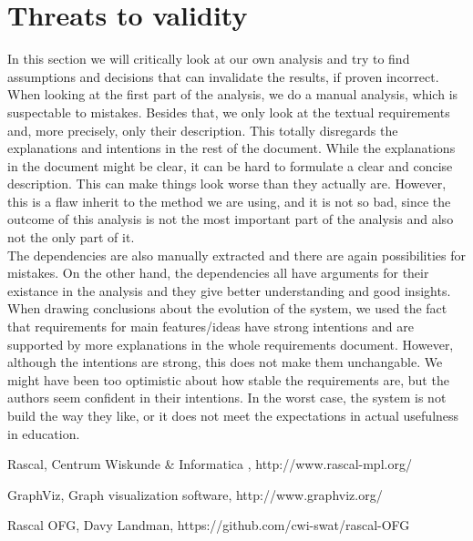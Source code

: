 \documentclass[a4paper,11pt]{article}
\begin{document}
	\section{Threats to validity}
		In this section we will critically look at our own analysis and try to find assumptions and decisions that can invalidate the results, if proven incorrect. \\
		When looking at the first part of the analysis, we do a manual analysis, which is suspectable to mistakes. Besides that, we only look at the textual requirements and, more precisely, only their description. This totally disregards the explanations and intentions in the rest of the document. While the explanations in the document might be clear, it can be hard to formulate a clear and concise description. This can make things look worse than they actually are. However, this is a flaw inherit to the method we are using, and it is not so bad, since the outcome of this analysis is not the most important part of the analysis and also not the only part of it. \\
		The dependencies are also manually extracted and there are again possibilities for mistakes. On the other hand, the dependencies all have arguments for their existance in the analysis and they give better understanding and good insights. \\
		When drawing conclusions about the evolution of the system, we used the fact that requirements for main features/ideas have strong intentions and are supported by more explanations in the whole requirements document. However, although the intentions are strong, this does not make them unchangable. We might have been too optimistic about how stable the requirements are, but the authors seem confident in their intentions. In the worst case, the system is not build the way they like, or it does not meet the expectations in actual usefulness in education. 

	\begin{thebibliography}{9}
			Rascal, Centrum Wiskunde \& Informatica , http://www.rascal-mpl.org/

			GraphViz, Graph visualization software, http://www.graphviz.org/
			
			Rascal OFG, Davy Landman, https://github.com/cwi-swat/rascal-OFG

	\end{thebibliography}
\end{document}
